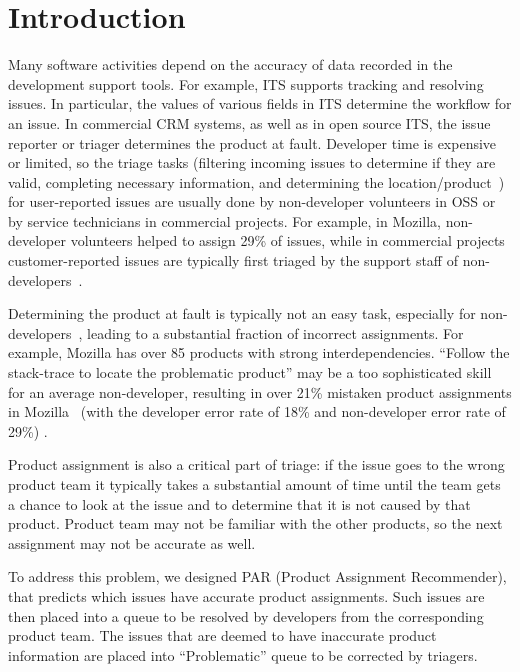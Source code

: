 \documentclass{sig-alternate}
\begin{document}
\section{Introduction}
Many software activities depend on the accuracy of data recorded in
the development support tools. For example, ITS supports
tracking and resolving issues. In particular, the values of various
fields in ITS determine the workflow for an issue. In commercial CRM
systems, as well as in open source ITS, the issue
 reporter or triager determines the product at fault.
Developer time is expensive or limited,  so the triage tasks
(filtering incoming issues to determine if they are valid,
completing necessary information, and determining the
location/product~\cite{XZM13}) for user-reported issues are usually done by
non-developer volunteers in OSS or by service technicians in commercial
projects.  For example, in Mozilla, non-developer volunteers helped
to assign 29\% of issues, while in commercial projects
customer-reported issues are typically first triaged by the support
staff of non-developers~\cite{XZM13}.

Determining the product at fault is typically not an easy task, especially for
non-developers~\cite{XZM13}, leading to a substantial fraction of
incorrect assignments. For example, Mozilla has over 85 products
with strong interdependencies.
``Follow the
stack-trace to locate the problematic product'' may be a too
sophisticated skill for an average non-developer, resulting in over
21\% mistaken product assignments in Mozilla~\cite{XZM13} (with
the developer error rate of 18\% and non-developer error rate of 29\%) .

Product assignment is also a critical part of triage: if the issue
goes to the wrong product team it typically takes a substantial
amount of time until the team gets a chance to look at the issue
and to determine that it is not caused by that product. Product team
may not be familiar with the other products, so the next assignment
may not be accurate as well.

To address this problem, we designed PAR (Product Assignment
Recommender), that predicts which issues have accurate product
assignments. Such issues are then placed into a queue to be resolved
by developers from the corresponding product team. The issues that
are deemed to have inaccurate product information are placed into
``Problematic'' queue to be corrected by triagers.
\end{document}
